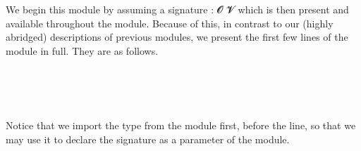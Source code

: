 We begin this module by assuming a signature  \as :  \ab 𝓞 \ab 𝓥 which is then present and available throughout the module.  Because of this, in contrast to our (highly abridged) descriptions of previous modules, we present the first few lines of the  module in full.  They are as follows.
\ccpad
\begin{code}%
\>[0]\AgdaSymbol{\{-\#}\AgdaSpace{}%
\AgdaSpace{}%
\AgdaSpace{}%
\AgdaSpace{}%
\AgdaSpace{}%
\AgdaSymbol{\#-\}}\<%
\\
%
\>[0]\AgdaSpace{}%
\AgdaSpace{}%
\AgdaSpace{}%
\AgdaSpace{}%
\AgdaSymbol{(}\AgdaSymbol{;}\AgdaSpace{}%
\AgdaSymbol{;}\AgdaSpace{}%
\AgdaSymbol{)}\<%
\\
%
\>[0]\AgdaSpace{}%
\AgdaSpace{}%
\AgdaSymbol{\{}\AgdaSpace{}%
\AgdaSymbol{:}\AgdaSpace{}%
\AgdaSpace{}%
\AgdaSpace{}%
\AgdaSymbol{\}}\AgdaSpace{}%
\<%
\\
%
\>[0]\AgdaSpace{}%
\AgdaSpace{}%
\AgdaSpace{}%
\AgdaSpace{}%
\AgdaSymbol{(}\AgdaSymbol{;}\AgdaSpace{}%
\AgdaSymbol{)}\AgdaSpace{}%
\<%
\end{code}
\ccpad
Notice that we import the  type from the  module first, before the  line, so that we may use it to declare the signature  as a parameter of the  module.


